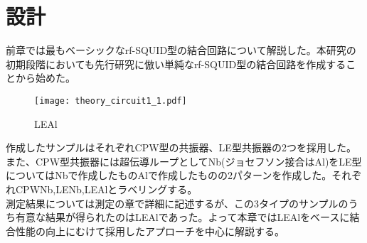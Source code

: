 \section{設計}
前章では最もベーシックなrf-SQUID型の結合回路について解説した。本研究の初期段階においても先行研究に倣い単純なrf-SQUID型の結合回路を作成することから始めた。
\begin{figure}[H]
    \centering
    \texttt{[image: theory\_circuit1\_1.pdf]}
    \caption{LEAl}
\end{figure}
作成したサンプルはそれぞれCPW型の共振器、LE型共振器の2つを採用した。また、CPW型共振器には超伝導ループとしてNb(ジョセフソン接合はAl)をLE型についてはNbで作成したものAlで作成したものの2パターンを作成した。それぞれCPWNb,LENb,LEAlとラベリングする。\\
測定結果については測定の章で詳細に記述するが、この3タイプのサンプルのうち有意な結果が得られたのはLEAlであった。よって本章ではLEAlをベースに結合性能の向上にむけて採用したアプローチを中心に解説する。\\


